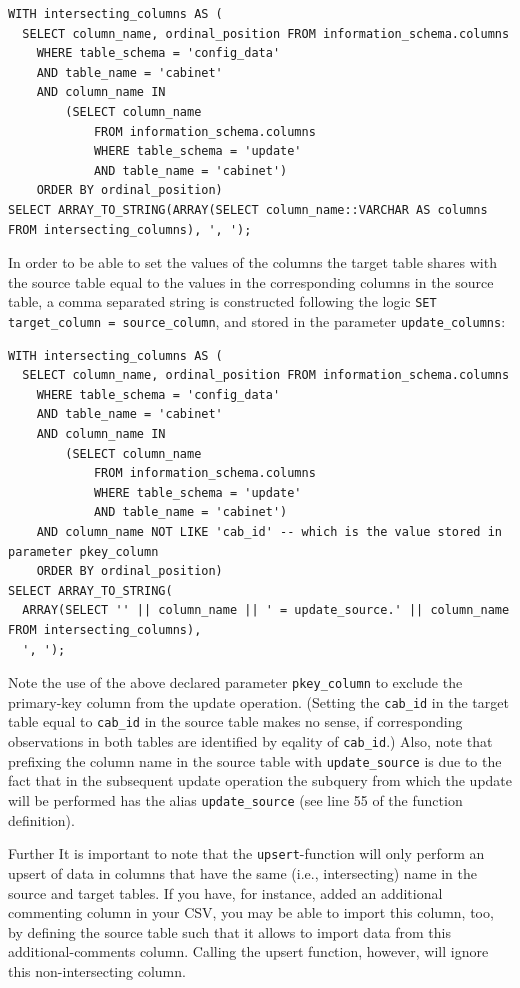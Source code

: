 \begin{lstlisting}[language=postgreSQL]
WITH intersecting_columns AS (
  SELECT column_name, ordinal_position FROM information_schema.columns 
  	WHERE table_schema = 'config_data' 
  	AND table_name = 'cabinet'
  	AND column_name IN 
  		(SELECT column_name 
  			FROM information_schema.columns 
  			WHERE table_schema = 'update'
  			AND table_name = 'cabinet')
  	ORDER BY ordinal_position)
SELECT ARRAY_TO_STRING(ARRAY(SELECT column_name::VARCHAR AS columns FROM intersecting_columns), ', ');	
\end{lstlisting}

In order to be able to set the values of the columns the target table shares with the source table equal to the values in the corresponding columns in the source table, a comma separated string is constructed following the logic \texttt{SET target\_column = source\_column}, and stored in the parameter \texttt{update\_columns}:

\begin{lstlisting}[language=postgreSQL]
WITH intersecting_columns AS (
  SELECT column_name, ordinal_position FROM information_schema.columns 
  	WHERE table_schema = 'config_data' 
  	AND table_name = 'cabinet'
  	AND column_name IN 
  		(SELECT column_name 
  			FROM information_schema.columns 
  			WHERE table_schema = 'update'
  			AND table_name = 'cabinet')
  	AND column_name NOT LIKE 'cab_id' -- which is the value stored in parameter pkey_column
  	ORDER BY ordinal_position)
SELECT ARRAY_TO_STRING(
  ARRAY(SELECT '' || column_name || ' = update_source.' || column_name FROM intersecting_columns),
  ', ');	
\end{lstlisting}

Note the use of the above declared parameter \texttt{pkey\_column} to exclude the primary-key column from the update operation. (Setting the \texttt{cab\_id} in the target table equal to \texttt{cab\_id} in the source table makes no sense, if corresponding observations in both tables are identified by eqality of  \texttt{cab\_id}.)
Also, note that prefixing the column name in the source table with \texttt{update\_source} is due to the fact that in the subsequent update operation the subquery from which the update will be performed has the alias \texttt{update\_source} (see line 55 of the function definition). 

Further It is important to note that the \texttt{upsert}-function will only perform an upsert of data in columns that have the same (i.e., intersecting) name in the source and target tables.
If you have, for instance, added an additional commenting column in your CSV, you may be able to import this column, too, by defining the source table such that it allows to import data from this additional-comments column. 
Calling the upsert function, however, will ignore this non-intersecting column.


